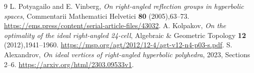 \documentclass[11pt]{article}
\begin{document}
\begin{thebibliography}{9}
 L. Potyagailo and E. Vinberg,
\emph{On right-angled reflection groups in hyperbolic spaces},
Commentarii Mathematici Helvetici \textbf{80} (2005),63--73.
\url{https://ems.press/content/serial-article-files/43032}.
 A. Kolpakov,
\emph{On the optimality of the ideal right-angled 24-cell},
Algebraic \& Geometric Topology \textbf{12} (2012),1941--1960.
\url{https://msp.org/agt/2012/12-4/agt-v12-n4-p03-s.pdf}.
 S. Alexandrov,
\emph{On ideal vertices of right-angled hyperbolic polyhedra},
2023, Sections 2--6.
\url{https://arxiv.org/html/2303.09533v1}.
\end{thebibliography}
\end{document}
